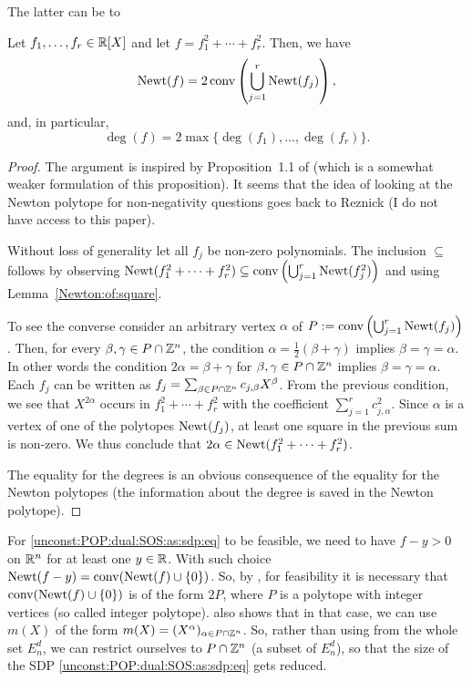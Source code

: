 The latter can be  to

\begin{proposition} \label{newton:SOS}
	Let $f_1,\ldots,f_r \in \mathbb{R}[X]$ and let $f=f_1^2 + \cdots + f_r^2$. Then, we have
	\[
		\operatorname{Newt}(f) = 2 \operatorname{conv} \left( \bigcup_{j=1}^r \operatorname{Newt}(f_j) \right),
	\]
	and, in particular, 
	\[
		\deg(f) = 2 \max \{\deg(f_1),\ldots,\deg(f_r)\}. 
	\]
\end{proposition} 
\begin{proof}
	The argument is inspired by Proposition~1.1 of \cite{chua2016gram} (which is a somewhat weaker formulation of this proposition). It seems that the idea of looking at the Newton polytope for non-negativity questions goes back to Reznick \cite{Reznick1978} (I do not have access to this paper). 
	
	Without loss of generality let all $f_j$ be non-zero polynomials. The inclusion $\subseteq$ follows by observing $\operatorname{Newt}(f_1^2 + \cdots + f_r^2) \subseteq \operatorname{conv} \left(\bigcup_{j=1}^r \operatorname{Newt}(f_j^2) \right)$ and using Lemma~\ref{Newton:of:square}.
	
	To see the converse consider an arbitrary vertex $\alpha$ of $P:=\operatorname{conv} \left( \bigcup_{j=1}^r \operatorname{Newt}(f_j) \right)$. Then, for every $\beta,\gamma \in P \cap \mathbb{Z}^n$, the condition $\alpha = \frac{1}{2}(\beta + \gamma)$ implies $\beta = \gamma = \alpha$.  In other words the condition $2 \alpha = \beta+ \gamma$ for $\beta, \gamma \in P \cap \mathbb{Z}^n$ implies $\beta=\gamma =\alpha$. Each $f_j$ can be written as $f_j = \sum_{\beta \in P \cap \mathbb{Z}^n} c_{j,\beta} X^\beta$. From the previous condition, we see that $X^{2 \alpha}$ occurs in $f_1^2 + \cdots + f_r^2$ with the coefficient $\sum_{j=1}^r c_{j,\alpha}^2$. Since $\alpha$ is a vertex of one of the polytopes $\operatorname{Newt}(f_j)$, at least one square in the previous sum is non-zero. We thus conclude that $2 \alpha \in \operatorname{Newt}(f_1^2 + \cdots +f_r^2)$. 
	
	The equality for the degrees is an obvious consequence of the equality for the Newton polytopes (the information about the degree is saved in the Newton polytope). 
\end{proof}

For \eqref{unconst:POP:dual:SOS:as:sdp:eq} to be feasible, we need to have $f - y>0$ on $\mathbb{R}^n$ for at least one $y \in \mathbb{R}$. With such choice $\operatorname{Newt}(f-y) = \operatorname{conv}(\operatorname{Newt}(f) \cup \{0\})$. So, by ,  for feasibility it is necessary that $\operatorname{conv}(\operatorname{Newt}(f) \cup \{0\})$ is of the form $2 P$, where $P$ is a polytope with integer vertices (so called integer polytope).  also shows that in that case, we can use $m(X)$ of the form $m(X) = (X^\alpha)_{\alpha \in P \cap \mathbb{Z}^n}$. So, rather than using  from the whole set $E_n^d$, we can restrict ourselves to $P \cap \mathbb{Z}^n$ (a subset of $E_n^d$), so that the size of the SDP \eqref{unconst:POP:dual:SOS:as:sdp:eq} gets reduced. 

